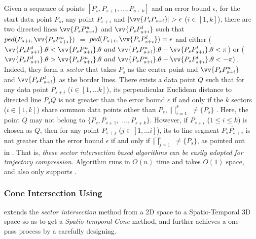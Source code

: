 Given a sequence of points $[P_{s}, P_{s+1}, \ldots, P_{s+k}]$ and an error bound $\epsilon$,
for the start data point $P_s$,
any point $P_{s+i}$ and $|\vv{P_sP_{s+i}}|>\epsilon$ ($i\in[1, k]$), there are two directed lines $\vv{P_sP^u_{s+i}}$ and $\vv{P_sP^l_{s+i}}$ such that $ped(P_{s+i}, \vv{P_sP^u_{s+i}})$ $=$ $ped(P_{s+i}, \vv{P_sP^l_{s+i}}) = \epsilon$ and either ($\vv{P_sP^l_{s+i}}.\theta < \vv{P_sP^u_{s+i}}.\theta ~and~\vv{P_sP^u_{s+i}}.\theta - \vv{P_sP^l_{s+i}}.\theta <\pi$) or ($\vv{P_sP^l_{s+i}}.\theta > \vv{P_sP^u_{s+i}}.\theta ~and~ \vv{P_sP^u_{s+i}}.\theta - \vv{P_sP^l_{s+i}}.\theta < -\pi)$. Indeed, they form a \emph{sector}  that takes $P_s$ as the center point and $\vv{P_sP^u_{s+i}}$ and $\vv{P_sP^l_{s+i}}$ as the border lines.
There exists a data point $Q$ such that for any data point $P_{s+i}$ ($i \in [1, ... k]$), its perpendicular Euclidean distance to
directed line $\overline{P_sQ}$ is not greater than the error bound $\epsilon$ if and only if the $k$ sectors  ($i\in[1,k]$) share common data points other than $P_s$, \ie $\bigsqcap_{i=1}^{k}$ $\ne \{P_s\}$ \cite{Williams:Longest, Sklansky:Cone,Zhao:Sleeve}.
%
Here, the point $Q$ may not belong to $\{P_{s}, P_{s+1},$ $\ldots, P_{s+k}\}$.
However, if $P_{s+i}$ ($1\le i\le k$) is chosen as $Q$, then
for any point $P_{s+j}$ ($j \in [1, ... i]$), its \ped to
line segment $\overline{P_sP_{s+i}}$ is not greater than the error bound $\epsilon$ if and only if $\bigsqcap_{j=1}^{i}$ $\ne \{P_s\}$, as pointed out in \cite{Zhao:Sleeve}.
That is, {\em these sector intersection based algorithms can be easily adopted for trajectory compression}.
%
Algorithm \siped runs in $O(n)$ time and takes $O(1)$ space, and \siped also only supports \ped.



\vspace{-0.5ex}
\subsubsection {Cone Intersection Using \sed}
\label{sec-cised}
\cised \cite{Lin:Cised} extends the \textit{sector intersection} method from a 2D space to a Spatio-Temporal 3D space so as to get a \textit{Spatio-temporal Cone} method, and further achieves a one-pass process by a carefully designing.

